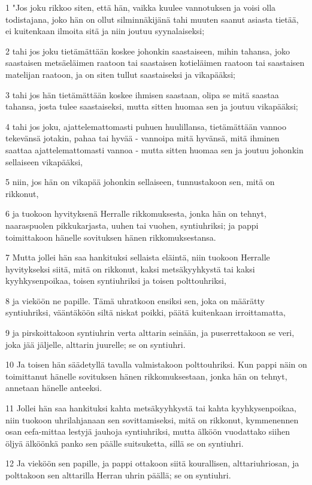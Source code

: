 \par 1 "Jos joku rikkoo siten, että hän, vaikka kuulee vannotuksen ja voisi olla todistajana, joko hän on ollut silminnäkijänä tahi muuten saanut asiasta tietää, ei kuitenkaan ilmoita sitä ja niin joutuu syynalaiseksi;
\par 2 tahi jos joku tietämättään koskee johonkin saastaiseen, mihin tahansa, joko saastaisen metsäeläimen raatoon tai saastaisen kotieläimen raatoon tai saastaisen matelijan raatoon, ja on siten tullut saastaiseksi ja vikapääksi;
\par 3 tahi jos hän tietämättään koskee ihmisen saastaan, olipa se mitä saastaa tahansa, josta tulee saastaiseksi, mutta sitten huomaa sen ja joutuu vikapääksi;
\par 4 tahi jos joku, ajattelemattomasti puhuen huulillansa, tietämättään vannoo tekevänsä jotakin, pahaa tai hyvää - vannoipa mitä hyvänsä, mitä ihminen saattaa ajattelemattomasti vannoa - mutta sitten huomaa sen ja joutuu johonkin sellaiseen vikapääksi,
\par 5 niin, jos hän on vikapää johonkin sellaiseen, tunnustakoon sen, mitä on rikkonut,
\par 6 ja tuokoon hyvityksenä Herralle rikkomuksesta, jonka hän on tehnyt, naaraspuolen pikkukarjasta, uuhen tai vuohen, syntiuhriksi; ja pappi toimittakoon hänelle sovituksen hänen rikkomuksestansa.
\par 7 Mutta jollei hän saa hankituksi sellaista eläintä, niin tuokoon Herralle hyvitykseksi siitä, mitä on rikkonut, kaksi metsäkyyhkystä tai kaksi kyyhkysenpoikaa, toisen syntiuhriksi ja toisen polttouhriksi,
\par 8 ja vieköön ne papille. Tämä uhratkoon ensiksi sen, joka on määrätty syntiuhriksi, vääntäköön siltä niskat poikki, päätä kuitenkaan irroittamatta,
\par 9 ja pirskoittakoon syntiuhrin verta alttarin seinään, ja puserrettakoon se veri, joka jää jäljelle, alttarin juurelle; se on syntiuhri.
\par 10 Ja toisen hän säädetyllä tavalla valmistakoon polttouhriksi. Kun pappi näin on toimittanut hänelle sovituksen hänen rikkomuksestaan, jonka hän on tehnyt, annetaan hänelle anteeksi.
\par 11 Jollei hän saa hankituksi kahta metsäkyyhkystä tai kahta kyyhkysenpoikaa, niin tuokoon uhrilahjanaan sen sovittamiseksi, mitä on rikkonut, kymmenennen osan eefa-mittaa lestyjä jauhoja syntiuhriksi, mutta älköön vuodattako siihen öljyä älköönkä panko sen päälle suitsuketta, sillä se on syntiuhri.
\par 12 Ja vieköön sen papille, ja pappi ottakoon siitä kourallisen, alttariuhriosan, ja polttakoon sen alttarilla Herran uhrin päällä; se on syntiuhri.
